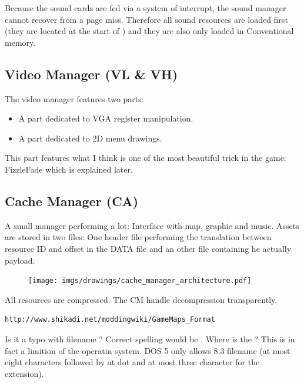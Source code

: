 \documentclass[book.tex]{subfiles}
\begin{document}
\par
{} Because the sound cards are fed via a system of interrupt, the sound manager cannot recover from a page miss. Therefore all sound resources are loaded first (they are located at the start of ) and they are also only loaded in Conventional memory.











\subsection{Video Manager (VL \& VH)}
The video manager features two parts:
\begin{itemize}
\item A part dedicated to VGA register manipulation.
\item A part dedicated to 2D menu drawings.
\end{itemize}
\par
This part features what I think is one of the most beautiful trick in the game: FizzleFade which is explained later.






\subsection{Cache Manager (CA)}
A small manager performing a lot: Interface with map, graphic and music. Assets are stored in two files: One header file performing the translation between resource ID and offset in the DATA file and an other file containing he actually payload.\\
 \par
\begin{figure}[H]
\centering
 \texttt{[image: imgs/drawings/cache\_manager\_architecture.pdf]}
 \end{figure}
 \par
{} All resources are compressed. The CM handle decompression transparently.
\begin{verbatim}
http://www.shikadi.net/moddingwiki/GameMaps_Format
\end{verbatim}
 Is it a typo with filename  ? Correct spelling would be . Where is the ? This is in fact a limition of the operatin system. DOS 5 only allows 8.3 filename (at most eight characters followed by at dot and at most three character for the extension).
\end{document}

